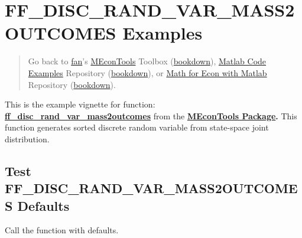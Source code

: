 \documentclass[
]{book}
\begin{document}
\hypertarget{ff_disc_rand_var_mass2outcomes-examples}{%
\section{FF\_DISC\_RAND\_VAR\_MASS2OUTCOMES Examples}\label{ff_disc_rand_var_mass2outcomes-examples}}

\begin{quote}
Go back to \href{http://fanwangecon.github.io/}{fan}'s \href{https://fanwangecon.github.io/MEconTools/}{MEconTools} Toolbox (\href{https://fanwangecon.github.io/MEconTools/bookdown}{bookdown}), \href{https://fanwangecon.github.io/M4Econ/}{Matlab Code Examples} Repository (\href{https://fanwangecon.github.io/M4Econ/bookdown}{bookdown}), or \href{https://fanwangecon.github.io/Math4Econ/}{Math for Econ with Matlab} Repository (\href{https://fanwangecon.github.io/Math4Econ/bookdown}{bookdown}).
\end{quote}

This is the example vignette for function:
\href{https://github.com/FanWangEcon/MEconTools/blob/master/MEconTools/stats/ff_disc_rand_var_mass2outcomes.m}{\textbf{ff\_disc\_rand\_var\_mass2outcomes}}
from the \href{https://fanwangecon.github.io/MEconTools/}{\textbf{MEconTools
Package}}\textbf{.} This function
generates sorted discrete random variable from state-space joint
distribution.

\hypertarget{test-ff_disc_rand_var_mass2outcomes-defaults}{%
\subsection{Test FF\_DISC\_RAND\_VAR\_MASS2OUTCOMES Defaults}\label{test-ff_disc_rand_var_mass2outcomes-defaults}}

Call the function with defaults.
\end{document}
